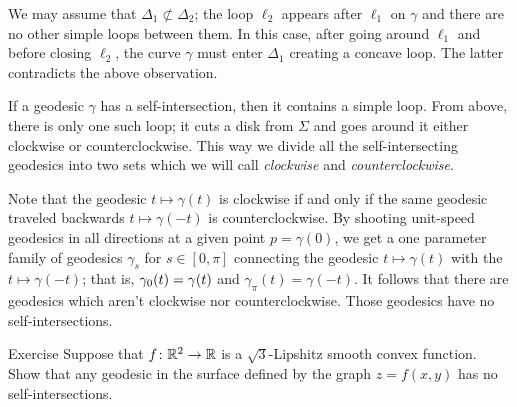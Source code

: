 We may assume that $\Delta_1\not\subset \Delta_2$; the loop $\ell_2$ appears after $\ell_1$ on $\gamma$ and there are no other simple loops between them.
In this case, after going around $\ell_1$ and before closing $\ell_2$, the curve $\gamma$ must enter $\Delta_1$ creating a concave loop.
The latter contradicts the above observation.

If a geodesic $\gamma$ has a self-intersection,
then it contains a simple loop.
From above, there is only one such loop;
it cuts a disk from $\Sigma$ 
and goes around it either clockwise or counterclockwise.
This way we divide all the self-intersecting geodesics 
into two sets which we will call {}\emph{clockwise} and {}\emph{counterclockwise}.

Note that the geodesic $t\mapsto \gamma(t)$ is clockwise 
if and only if the same geodesic traveled backwards
$t\mapsto \gamma(-t)$
is counterclockwise.
By shooting unit-speed geodesics in all directions at a given point $p=\gamma(0)$,
we get a one parameter family of geodesics $\gamma_s$ for $s\in[0,\pi]$ connecting the geodesic $t\mapsto \gamma(t)$ with
the $t\mapsto \gamma(-t)$; that is, $\gamma_0(t)\z=\gamma(t)$ and $\gamma_\pi(t)=\gamma(-t)$. 
It follows that there are geodesics 
which aren't clockwise nor counterclockwise.
Those geodesics have no self-intersections.\qeds

\begin{thm}{Exercise}
Suppose that $f\colon\mathbb{R}^2\to\mathbb{R}$ is a $\sqrt{3}$-Lipshitz smooth convex function.
Show that any geodesic in the surface defined by the graph $z=f(x,y)$ has no self-intersections.
\end{thm}



